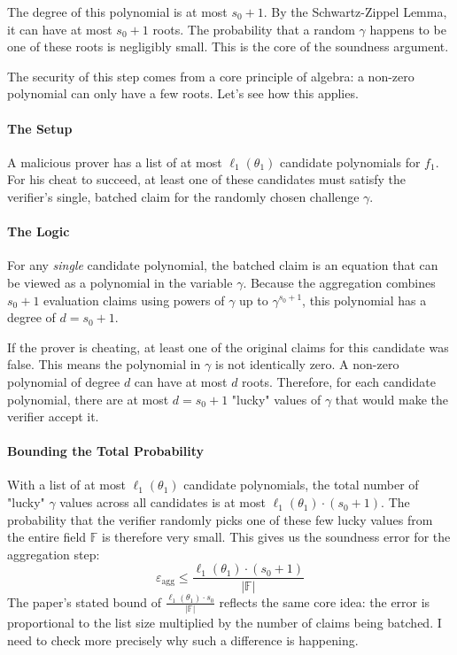 \documentclass{article}
\begin{document}
The degree of this polynomial is at most $s_0+1$. By the Schwartz-Zippel Lemma, it can have at most $s_0+1$ roots. The probability that a random $\gamma$ happens to be one of these roots is negligibly small. This is the core of the soundness argument.

\begin{tcolorbox}[breakable, title={Why Batching is Secure: The Soundness Argument}]
The security of this step comes from a core principle of algebra: a non-zero polynomial can only have a few roots. Let's see how this applies.

\paragraph{The Setup}
A malicious prover has a list of at most $\ell_1(\theta_1)$ candidate polynomials for $f_1$. For his cheat to succeed, at least one of these candidates must satisfy the verifier's single, batched claim for the randomly chosen challenge $\gamma$.

\paragraph{The Logic}
For any \textit{single} candidate polynomial, the batched claim is an equation that can be viewed as a polynomial in the variable $\gamma$. Because the aggregation combines $s_0+1$ evaluation claims using powers of $\gamma$ up to $\gamma^{s_0+1}$, this polynomial has a degree of $d = s_0+1$.

If the prover is cheating, at least one of the original claims for this candidate was false. This means the polynomial in $\gamma$ is not identically zero. A non-zero polynomial of degree $d$ can have at most $d$ roots. Therefore, for each candidate polynomial, there are at most $d = s_0+1$ "lucky" values of $\gamma$ that would make the verifier accept it.

\paragraph{Bounding the Total Probability}
With a list of at most $\ell_1(\theta_1)$ candidate polynomials, the total number of "lucky" $\gamma$ values across all candidates is at most $\ell_1(\theta_1) \cdot (s_0+1)$. The probability that the verifier randomly picks one of these few lucky values from the entire field $\mathbb{F}$ is therefore very small. This gives us the soundness error for the aggregation step:
\[
\varepsilon_{\text{agg}} \le \frac{\ell_1(\theta_1) \cdot (s_0+1)}{|\mathbb{F}|}
\]
The paper's stated bound of $\frac{\ell_1(\theta_1) \cdot s_0}{|\mathbb{F}|}$ reflects the same core idea: the error is proportional to the list size multiplied by the number of claims being batched. I need to check more precisely why such a difference is happening.
\end{tcolorbox}
\end{document}
